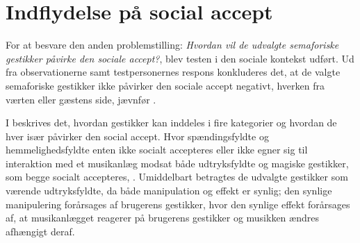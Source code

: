 \section{Indflydelse på social accept}
\label{DiskussionSocialAccept}
%
For at besvare den anden problemstilling: \textit{Hvordan vil de udvalgte semaforiske gestikker påvirke den sociale accept?}, blev testen i den sociale kontekst udført. Ud fra observationerne samt testpersonernes respons konkluderes det, at de valgte semaforiske gestikker ikke påvirker den sociale accept negativt, hverken fra værten eller gæstens side, jævnfør .
 
I  beskrives det, hvordan gestikker kan inddeles i fire kategorier og hvordan de hver især påvirker den social accept. Hvor spændingsfyldte og hemmelighedsfyldte enten ikke socialt accepteres eller ikke egner sig til interaktion med et musikanlæg modsat både udtryksfyldte og magiske gestikker, som begge socialt accepteres, \parencite[s. 276]{PDF:WouldYouDoThat}. Umiddelbart betragtes de udvalgte gestikker som værende udtryksfyldte, da både manipulation og effekt er synlig; den synlige manipulering forårsages af brugerens gestikker, hvor den synlige effekt forårsages af, at musikanlægget reagerer på brugerens gestikker og musikken ændres afhængigt deraf.

